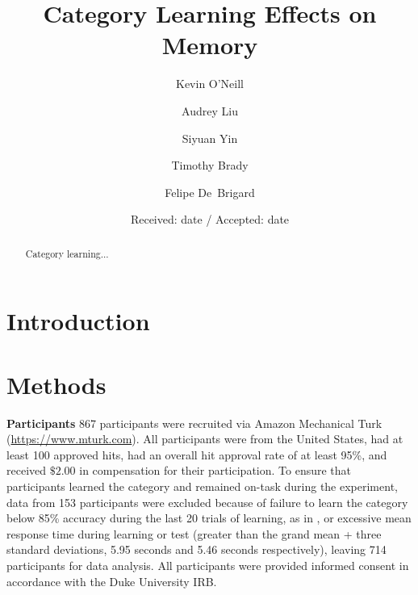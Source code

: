 \documentclass[twocolumn]{svjour3}          %
\begin{document}
\title{Category Learning Effects on Memory
}


\author{Kevin O'Neill \and Audrey Liu \and Siyuan Yin \and Timothy Brady \and Felipe De~Brigard}


\date{Received: date / Accepted: date}


\maketitle

\begin{abstract}
Category learning...
\end{abstract}

\section*{Introduction}
\label{intro}

\section*{Methods}
\label{methods}

\textbf{Participants }
867 participants were recruited via Amazon Mechanical Turk
(\url{https://www.mturk.com}). All participants were from the United
States, had at least 100 approved hits, had an overall hit approval
rate of at least 95\%, and received $\$2.00$ in compensation for their
participation. To ensure that participants learned the category and
remained on-task during the experiment, data from 153 participants
were excluded because of failure to learn the category below 85\%
accuracy during the last 20 trials of learning, as in
\cite{DeBrigard2017}, or excessive mean response time during learning
or test (greater than the grand mean + three standard deviations, 5.95
seconds and 5.46 seconds respectively), leaving 714 participants for
data analysis. All participants were provided informed consent in
accordance with the Duke University IRB.
\end{document}
